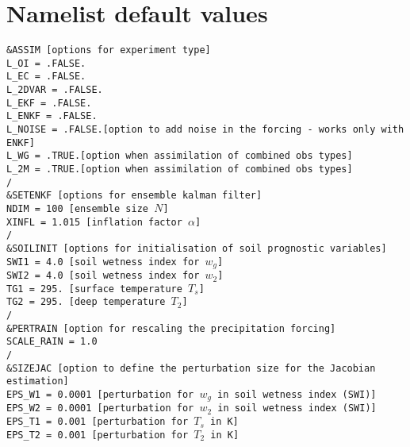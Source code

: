 \documentclass[12pt]{article}
\begin{document}
\section{Namelist default values}
$~$\\
 {\tt \&ASSIM {\rm [options for experiment type]} \\
   L\_OI = .FALSE.\\
   L\_EC = .FALSE.\\
   L\_2DVAR = .FALSE.\\
   L\_EKF = .FALSE.\\
   L\_ENKF = .FALSE.\\
   L\_NOISE = .FALSE.[\rm option to add noise in the forcing - works only with ENKF]\\
   L\_WG = .TRUE.[\rm option when assimilation of combined obs types]\\
   L\_2M = .TRUE.[\rm option when assimilation of combined obs types]\\
 /\\
 \&SETENKF {\rm [options for ensemble kalman filter]}\\
   NDIM = 100 {\rm [ensemble size $N$]\\
   XINFL = 1.015 {\rm [inflation factor $\alpha$]\\
 /\\
 \&SOILINIT {\rm [options for initialisation of soil prognostic variables]}\\
   SWI1 = 4.0 [\rm soil wetness index for $w_g$]\\
   SWI2 = 4.0 [\rm soil wetness index for $w_2$]\\
   TG1 = 295. [\rm surface temperature $T_s$]\\
   TG2 = 295. [\rm deep temperature $T_2$]\\
 /\\
 \&PERTRAIN {\rm [option for rescaling the precipitation forcing]}\\
   SCALE\_RAIN = 1.0\\
 /\\
 \&SIZEJAC {\rm [option to define the perturbation size for the Jacobian estimation]\\
   EPS\_W1 = 0.0001 [\rm perturbation for $w_g$ in soil wetness index (SWI)]\\
   EPS\_W2 = 0.0001 [\rm perturbation for $w_2$ in soil wetness index (SWI)]\\
   EPS\_T1 = 0.001  [\rm perturbation for $T_s$ in K] \\
   EPS\_T2 = 0.001  [\rm perturbation for $T_2$ in K]\\
}}}}
\end{document}
